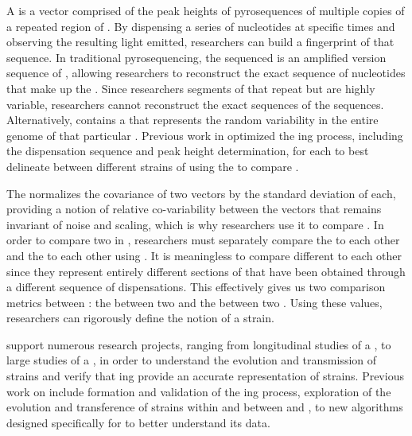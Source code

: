 A \pyro{} is a vector comprised of the peak heights of pyrosequences of multiple copies of a repeated region of \dna{}.
By dispensing a series of nucleotides at specific times and observing the resulting light emitted, \cplop{} researchers can build a fingerprint of that \dna{} sequence.
In traditional pyrosequencing, the \dna{} sequenced is an amplified version sequence of \dna{}, allowing researchers to reconstruct the exact sequence of nucleotides that make up the \dna{}.
Since \cplop{} researchers \pyro{} segments of \dna{} that repeat but are highly variable, researchers cannot reconstruct the exact sequences of the \itsshort{} sequences.
Alternatively, \cplop{} contains a \pyro{} that represents the random variability in the entire genome of that particular \ecoli{} \isol{}.
Previous work in \cite{Shealy:SeniorProject} optimized the \pyro{}ing process, including the dispensation sequence and peak height determination, for each \itsshort{} to best delineate between different strains of \ecoli{} using the \pearson{} to compare \pyros{}.

The \pearson{} normalizes the covariance of two vectors by the standard deviation of each, providing a notion of relative co-variability between the vectors that remains invariant of noise and scaling, which is why \cplop{} researchers use it to compare \pyros{}.
In order to compare two \ecoli{} \isols{} in \cplop{}, researchers must separately compare the \Gsixt{} \pyros{} to each other and the \Gfive{} \pyros{} to each other using \pearson{}.
It is meaningless to compare different \itsshort{} to each other since they represent entirely different sections of \dna{} that have been obtained through a different sequence of dispensations.
This effectively gives us two comparison metrics between \isols{}: the \pearson{} between two \Gsixt{} and the \pearson{} \pyros{} between two \Gfive{} \pyros{}.
Using these values, \cplop{} researchers can rigorously define the notion of a strain.

\cplop{} support numerous research projects, ranging from longitudinal studies of a \host{}, to large studies of a \spec{}, in order to understand the evolution and transmission of \ecoli{} strains and verify that \pyro{}ing provide an accurate representation of \ecoli{} strains.
Previous work on \cplop{} include formation and validation of the \pyro{}ing process, exploration of the evolution and transference of \ecoli{} strains within and between \host{} and \spec{}, to new algorithms designed specifically for \cplop{} to better understand its data.

